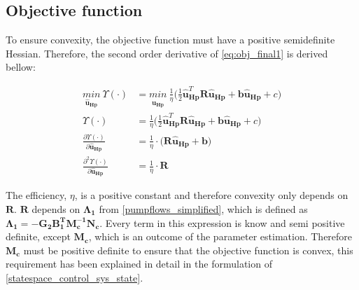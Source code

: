 \subsection{Objective function}
To ensure convexity, the objective function must have a positive semidefinite Hessian. Therefore, the second order derivative of \eqref{eq:obj_final1} is derived bellow: 
%
%
%
%
%


\begin{align}
\underset{\bm{\hat{u}_{Hp}}}{min} \:  \Upsilon(\cdot) &= \underset{\bm{\hat{u}_{Hp}}}{min} \:  \frac{1}{\eta}\bigg( \frac{1}{2} \bm{\hat{u}}_{\bm{Hp}}^{T} \bm{R} \bm{\hat{u}}_{\bm{Hp}} + \bm{b} \bm{\hat{u}}_{\bm{Hp}} + c \bigg)\\
%
\Upsilon(\cdot) &= \frac{1}{\eta}\bigg( \frac{1}{2} \bm{\hat{u}}_{\bm{Hp}}^{T} \bm{R} \bm{\hat{u}}_{\bm{Hp}} + \bm{b} \bm{\hat{u}}_{\bm{Hp}} + c \bigg)\\
%
\frac{\partial \Upsilon(\cdot)}{\partial \bm{\hat{u}}_{\bm{Hp}}} &= \frac{1}{\eta}\cdot \big(\bm{R} \bm{\hat{u}}_{\bm{Hp}} + \bm{b} \big)\\
%
\frac{\partial^2 \Upsilon(\cdot)}{\partial \bm{\hat{u}}_{\bm{Hp}}} &= \frac{1}{\eta}\cdot \bm{R} 
%
\end{align}

The efficiency, $\eta$, is a positive constant and therefore convexity only depends on $\bm{R}$. $\bm{R}$ depends on $\bm{\Lambda_1}$ from \eqref{pumpflows_simplified}, which is defined as $\bm{\Lambda_1} = -\bm{G_{2}} \bm{B_{1}^T}\bm{M_c^{-1}}\bm{N_c}$. Every term in this expression is know and semi positive definite, except $\bm{M_c}$, which is an outcome of the parameter estimation. Therefore $\bm{M_c}$ must be positive definite to ensure that the objective function is convex, this requirement has been explained in detail in the formulation of \eqref{statespace_control_sys_state}.

